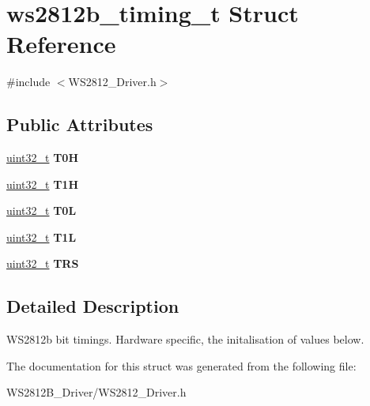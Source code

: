 \hypertarget{structws2812b__timing__t}{}\section{ws2812b\+\_\+timing\+\_\+t Struct Reference}
\label{structws2812b__timing__t}


{\ttfamily \#include $<$W\+S2812\+\_\+\+Driver.\+h$>$}

\subsection*{Public Attributes}
\begin{DoxyCompactItemize}
\item 
\mbox{\label{structws2812b__timing__t_a8b6e1564ed489fed956999c2273aba7c}} 
\hyperlink{vl53l0x__types_8h_a435d1572bf3f880d55459d9805097f62}{uint32\+\_\+t} {\bfseries T0H}
\item 
\mbox{\label{structws2812b__timing__t_ad08b62a9ac0084ac6295f8fc9c649e14}} 
\hyperlink{vl53l0x__types_8h_a435d1572bf3f880d55459d9805097f62}{uint32\+\_\+t} {\bfseries T1H}
\item 
\mbox{\label{structws2812b__timing__t_aeb5bb8b1557d37ee693b0ddb10894a4c}} 
\hyperlink{vl53l0x__types_8h_a435d1572bf3f880d55459d9805097f62}{uint32\+\_\+t} {\bfseries T0L}
\item 
\mbox{\label{structws2812b__timing__t_a692863d7cca96b33badea74e5b611eee}} 
\hyperlink{vl53l0x__types_8h_a435d1572bf3f880d55459d9805097f62}{uint32\+\_\+t} {\bfseries T1L}
\item 
\mbox{\label{structws2812b__timing__t_a620c5ea548482cf42b775f1fa45c494a}} 
\hyperlink{vl53l0x__types_8h_a435d1572bf3f880d55459d9805097f62}{uint32\+\_\+t} {\bfseries T\+RS}
\end{DoxyCompactItemize}


\subsection{Detailed Description}
W\+S2812b bit timings. Hardware specific, the initalisation of values below. 

The documentation for this struct was generated from the following file\+:\begin{DoxyCompactItemize}
\item 
W\+S2812\+B\+\_\+\+Driver/W\+S2812\+\_\+\+Driver.\+h\end{DoxyCompactItemize}
